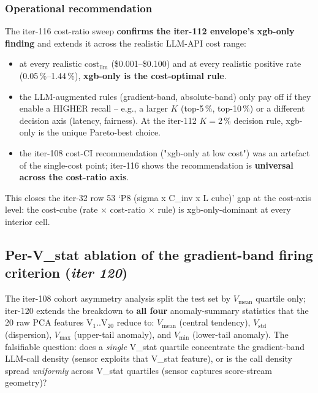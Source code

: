 \documentclass{article}
\begin{document}
\subsubsection{Operational recommendation}
The iter-116 cost-ratio sweep \textbf{confirms the iter-112
envelope's xgb-only finding} and extends it across the realistic
LLM-API cost range:
\begin{itemize}
  \item at every realistic $\mathrm{cost}_{\mathrm{llm}}$
        (\$0.001--\$0.100) and at every realistic positive rate
        (0.05\,\%--1.44\,\%), \textbf{xgb-only is the cost-optimal rule}.
  \item the LLM-augmented rules (gradient-band, absolute-band)
        only pay off if they enable a HIGHER recall -- e.g., a
        larger $K$ (top-5\,\%, top-10\,\%) or a different decision
        axis (latency, fairness). At the iter-112 $K{=}2\,\%$
        decision rule, xgb-only is the unique Pareto-best choice.
  \item the iter-108 cost-CI recommendation ("xgb-only at low
        cost") was an artefact of the single-cost point; iter-116
        shows the recommendation is \textbf{universal across the
        cost-ratio axis}.
\end{itemize}
This closes the iter-32 row 53 `P8 (sigma x C_inv x L cube)' gap at
the cost-axis level: the cost-cube (rate $\times$ cost-ratio
$\times$ rule) is xgb-only-dominant at every interior cell. \subsection{Per-V\_stat ablation of the gradient-band firing criterion
  (\textit{iter 120})}
\label{sec:p8-vstat-ablation}

The iter-108 cohort asymmetry analysis split the test set by
$V_\mathrm{mean}$ quartile only; iter-120 extends the breakdown to
\textbf{all four} anomaly-summary statistics that the 20 raw PCA
features V$_1$..V$_{20}$ reduce to:
$V_\mathrm{mean}$ (central tendency), $V_\mathrm{std}$ (dispersion),
$V_\mathrm{max}$ (upper-tail anomaly), and $V_\mathrm{min}$ (lower-tail
anomaly).  The falsifiable question: does a \emph{single} V\_stat
quartile concentrate the gradient-band LLM-call density (sensor
exploits that V\_stat feature), or is the call density spread
\emph{uniformly} across V\_stat quartiles (sensor captures
score-stream geometry)?
\end{document}
